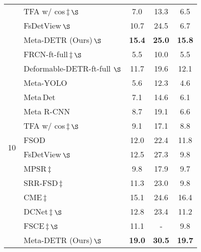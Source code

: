\documentclass[letterpaper]{article} \usepackage{aaai22}  \usepackage{times}  \usepackage{helvet}  \usepackage{courier}  \usepackage[hyphens]{url}  \usepackage{graphicx} \urlstyle{rm} \def\UrlFont{\rm}  \usepackage{natbib}  \usepackage{caption} \DeclareCaptionStyle{ruled}{labelfont=normalfont,labelsep=colon,strut=off} \frenchspacing  \setlength{\pdfpagewidth}{8.5in}  \setlength{\pdfpageheight}{11in}  \usepackage{algorithm}
\begin{document}
\begin{table}[t!]
\begin{center}
{\begin{tabular}[t]{ c | l | ccc }
& TFA w/ cos\;\cite{fsdet}\,$\ddag$\,$\S$ & 7.0 & 13.3 & 6.5 \\

& FsDetView\;\cite{FSDetView}\,$\S$ & 10.7 & 24.5 & 6.7 \\

& \cellcolor{black!6}Meta-DETR (Ours)\,$\S$ & \cellcolor{black!6}\textbf{15.4} & \cellcolor{black!6}\textbf{25.0} & \cellcolor{black!6}\textbf{15.8} \\

\midrule[0.68pt]

\multirow{14}{*}{10} & FRCN-ft-full\;\cite{FasterRCNN}\,$\ddag$\,$\S$ & 5.5 & 10.0 & 5.5 \\

& Deformable-DETR-ft-full\,\cite{DeformableDETR}\,$\S$ & 11.7 & 19.6 & 12.1 \\

& Meta-YOLO\;\cite{FewshotReweighting} & 5.6 & 12.3 & 4.6 \\

& Meta\,Det\;\cite{metadet} & 7.1 & 14.6 & 6.1 \\

& Meta R-CNN\;\cite{metarcnn} & 8.7 & 19.1 & 6.6 \\

& TFA w/ cos\;\cite{fsdet}\,$\ddag$\,$\S$ & 9.1 & 17.1 & 8.8 \\

& FSOD\;\cite{fsod} & 12.0 & 22.4 & 11.8 \\

& FsDetView\;\cite{FSDetView}\,$\S$ & 12.5 & 27.3 & 9.8 \\

& MPSR\;\cite{MPSR}\,$\ddag$ & 9.8 & 17.9 & 9.7  \\

& SRR-FSD\;\cite{SRR-FSD}\,$\ddag$ & 11.3 & 23.0 & 9.8 \\

& CME\;\cite{CME}\,$\ddag$ & 15.1 & 24.6 & 16.4 \\

& DCNet\;\cite{DenseRelationDistillation}\,$\ddag$\,$\S$ & 12.8 & 23.4 & 11.2 \\

& FSCE\;\cite{fsce}\,$\ddag$\,$\S$ & 11.1 & - & 9.8 \\

& \cellcolor{black!6}Meta-DETR (Ours)\,$\S$ & \cellcolor{black!6}\textbf{19.0} & \cellcolor{black!6}\textbf{30.5} & \cellcolor{black!6}\textbf{19.7}\\


\end{tabular}}
\end{center}
\end{table}
\end{document}
